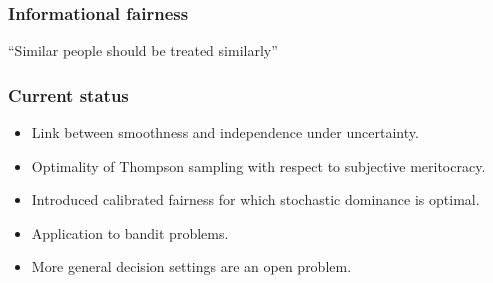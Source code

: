 \begin{frame}
\frametitle{Informational fairness}

  ``Similar people should be treated similarly''

\end{frame}

\begin{frame}
  \frametitle{Current status}
  \begin{itemize}
  \item Link between smoothness and independence under uncertainty.
  \item Optimality of Thompson sampling with respect to subjective meritocracy.
  \item Introduced calibrated fairness for which stochastic dominance is optimal.
  \item Application to bandit problems.
  \item More general decision settings are an open problem.
  \end{itemize}

\end{frame}







